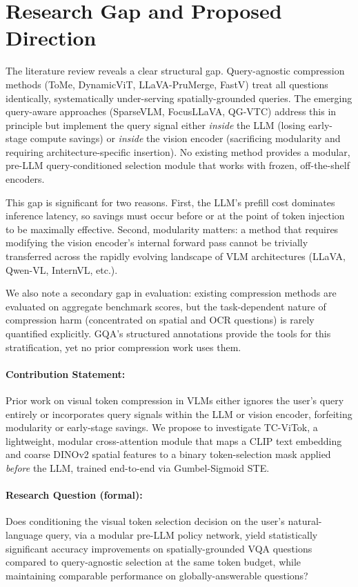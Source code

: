 \documentclass[11pt,twocolumn]{article}
\begin{document}
\section{Research Gap and Proposed Direction}
\label{sec:gap}

The literature review reveals a clear structural gap. Query-agnostic compression methods (ToMe, DynamicViT, LLaVA-PruMerge, FastV) treat all questions identically, systematically under-serving spatially-grounded queries. The emerging query-aware approaches (SparseVLM, FocusLLaVA, QG-VTC) address this in principle but implement the query signal either \emph{inside} the LLM (losing early-stage compute savings) or \emph{inside} the vision encoder (sacrificing modularity and requiring architecture-specific insertion). No existing method provides a modular, pre-LLM query-conditioned selection module that works with frozen, off-the-shelf encoders.

This gap is significant for two reasons. First, the LLM's prefill cost dominates inference latency, so savings must occur before or at the point of token injection to be maximally effective. Second, modularity matters: a method that requires modifying the vision encoder's internal forward pass cannot be trivially transferred across the rapidly evolving landscape of VLM architectures (LLaVA, Qwen-VL, InternVL, etc.).

We also note a secondary gap in evaluation: existing compression methods are evaluated on aggregate benchmark scores, but the task-dependent nature of compression harm (concentrated on spatial and OCR questions) is rarely quantified explicitly. GQA's structured annotations provide the tools for this stratification, yet no prior compression work uses them.

\paragraph{Contribution Statement:}
Prior work on visual token compression in VLMs either ignores the user's query entirely or incorporates query signals within the LLM or vision encoder, forfeiting modularity or early-stage savings. We propose to investigate TC-ViTok, a lightweight, modular cross-attention module that maps a CLIP text embedding and coarse DINOv2 spatial features to a binary token-selection mask applied \emph{before} the LLM, trained end-to-end via Gumbel-Sigmoid STE.

\paragraph{Research Question (formal):}
Does conditioning the visual token selection decision on the user's natural-language query, via a modular pre-LLM policy network, yield statistically significant accuracy improvements on spatially-grounded VQA questions compared to query-agnostic selection at the same token budget, while maintaining comparable performance on globally-answerable questions?
\end{document}
